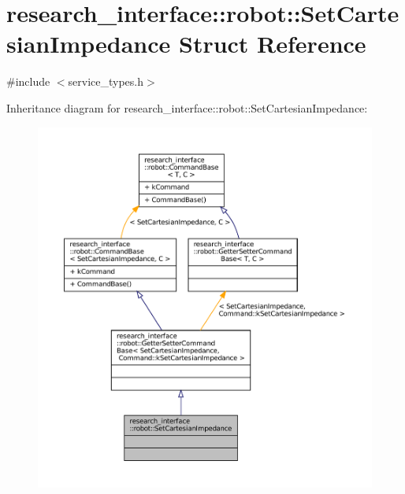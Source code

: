 \hypertarget{structresearch__interface_1_1robot_1_1SetCartesianImpedance}{}\section{research\+\_\+interface\+:\+:robot\+:\+:Set\+Cartesian\+Impedance Struct Reference}
\label{structresearch__interface_1_1robot_1_1SetCartesianImpedance}


{\ttfamily \#include $<$service\+\_\+types.\+h$>$}



Inheritance diagram for research\+\_\+interface\+:\+:robot\+:\+:Set\+Cartesian\+Impedance\+:
\nopagebreak
\begin{figure}[H]
\begin{center}
\leavevmode
\includegraphics[width=350pt]{structresearch__interface_1_1robot_1_1SetCartesianImpedance__inherit__graph}
\end{center}
\end{figure}


